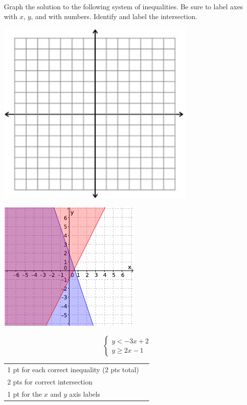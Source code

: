 {
	Graph the solution to the following system of inequalities. Be sure to label axes with $x$, $y$, and with numbers. Identify and label the intersection. \begin{onlyproblem}\begin{center}\includegraphics{fig-graphpaper.png}\end{center}\end{onlyproblem} \begin{onlysolution}\begin{center}\includegraphics{fig095-12-a-answer}\end{center}\end{onlysolution}
	$$\begin{cases}y<-3x+2\\ y\geq 2x-1 \end{cases}$$
}
{
	\begin{tabular}{l r}
	1 pt for each correct inequality (2 pts total)\\
	2 pts for correct intersection\\
	1 pt for the $x$ and $y$ axis labels\\
	\end{tabular}
}

